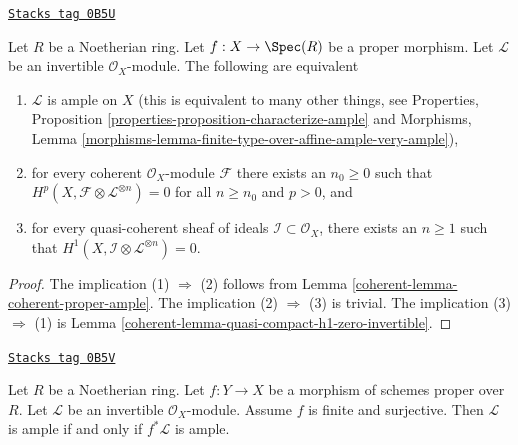 \begin{lemma}
\label{coherent-lemma-vanshing-gives-ample}
\href{https://stacks.math.columbia.edu/tag/0B5U}{\texttt{Stacks tag 0B5U}}

\begin{reference}
\cite[III Proposition 2.6.1]{EGA}
\end{reference}
Let $R$ be a Noetherian ring. Let $f : X \to \Spec(R)$ be a proper morphism.
Let $\mathcal{L}$ be an invertible $\mathcal{O}_X$-module.
The following are equivalent
\begin{enumerate}
\item $\mathcal{L}$ is ample on $X$ (this is equivalent to many other
things, see
Properties, Proposition \ref{properties-proposition-characterize-ample} and
Morphisms, Lemma
\ref{morphisms-lemma-finite-type-over-affine-ample-very-ample}),
\item for every coherent $\mathcal{O}_X$-module $\mathcal{F}$ there exists
an $n_0 \geq 0$ such that
$H^p(X, \mathcal{F} \otimes \mathcal{L}^{\otimes n}) = 0$ for all $n \geq n_0$
and $p > 0$, and
\item for every quasi-coherent sheaf of ideals
$\mathcal{I} \subset \mathcal{O}_X$, there exists an $n \geq 1$
such that $H^1(X, \mathcal{I} \otimes \mathcal{L}^{\otimes n}) = 0$.
\end{enumerate}
\end{lemma}

\begin{proof}

The implication (1) $\Rightarrow$ (2) follows from
Lemma \ref{coherent-lemma-coherent-proper-ample}.
The implication (2) $\Rightarrow$ (3) is trivial.
The implication (3) $\Rightarrow$ (1) is
Lemma \ref{coherent-lemma-quasi-compact-h1-zero-invertible}.
\end{proof}

\begin{lemma}
\label{coherent-lemma-surjective-finite-morphism-ample}
\href{https://stacks.math.columbia.edu/tag/0B5V}{\texttt{Stacks tag 0B5V}}

Let $R$ be a Noetherian ring. Let $f : Y \to X$ be a morphism of
schemes proper over $R$. Let $\mathcal{L}$ be an
invertible $\mathcal{O}_X$-module. Assume $f$ is finite and surjective.
Then $\mathcal{L}$ is ample if and only if $f^*\mathcal{L}$ is ample.
\end{lemma}

